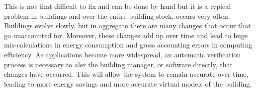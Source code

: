 This is not that difficult to fix and can be done by hand but it is a typical problem in buildings and over the entire building stock, 
occurs very often.  Buildings evolve slowly, but in aggregate there are many changes that occur that go unaccounted for.  Moreover, these
changes add up over time and lead to huge mis-calculations in energy consumption and gross accounting errors in computing efficiency.
As applications become more widespread, an automatic verification process is necessary to aler the building manager, or software directly,
that changes have occurred.  This will allow the system to remain accurate over time, leading to more energy savings and more accurate
virtual models of the building.













